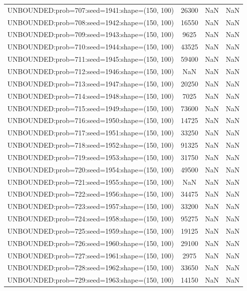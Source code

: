 \begin{longtable}{lccc}
UNBOUNDED:prob=707:seed=1941:shape=(150, 100) & 26300 &   NaN &    NaN \\
UNBOUNDED:prob=708:seed=1942:shape=(150, 100) & 16550 &   NaN &    NaN \\
UNBOUNDED:prob=709:seed=1943:shape=(150, 100) &  9625 &   NaN &    NaN \\
UNBOUNDED:prob=710:seed=1944:shape=(150, 100) & 43525 &   NaN &    NaN \\
UNBOUNDED:prob=711:seed=1945:shape=(150, 100) & 59400 &   NaN &    NaN \\
UNBOUNDED:prob=712:seed=1946:shape=(150, 100) &   NaN &   NaN &    NaN \\
UNBOUNDED:prob=713:seed=1947:shape=(150, 100) & 20250 &   NaN &    NaN \\
UNBOUNDED:prob=714:seed=1948:shape=(150, 100) &  7025 &   NaN &    NaN \\
UNBOUNDED:prob=715:seed=1949:shape=(150, 100) & 73600 &   NaN &    NaN \\
UNBOUNDED:prob=716:seed=1950:shape=(150, 100) & 14725 &   NaN &    NaN \\
UNBOUNDED:prob=717:seed=1951:shape=(150, 100) & 33250 &   NaN &    NaN \\
UNBOUNDED:prob=718:seed=1952:shape=(150, 100) & 91325 &   NaN &    NaN \\
UNBOUNDED:prob=719:seed=1953:shape=(150, 100) & 31750 &   NaN &    NaN \\
UNBOUNDED:prob=720:seed=1954:shape=(150, 100) & 49500 &   NaN &    NaN \\
UNBOUNDED:prob=721:seed=1955:shape=(150, 100) &   NaN &   NaN &    NaN \\
UNBOUNDED:prob=722:seed=1956:shape=(150, 100) & 34475 &   NaN &    NaN \\
UNBOUNDED:prob=723:seed=1957:shape=(150, 100) & 33200 &   NaN &    NaN \\
UNBOUNDED:prob=724:seed=1958:shape=(150, 100) & 95275 &   NaN &    NaN \\
UNBOUNDED:prob=725:seed=1959:shape=(150, 100) & 19125 &   NaN &    NaN \\
UNBOUNDED:prob=726:seed=1960:shape=(150, 100) & 29100 &   NaN &    NaN \\
UNBOUNDED:prob=727:seed=1961:shape=(150, 100) &  2975 &   NaN &    NaN \\
UNBOUNDED:prob=728:seed=1962:shape=(150, 100) & 33650 &   NaN &    NaN \\
UNBOUNDED:prob=729:seed=1963:shape=(150, 100) & 14150 &   NaN &    NaN \\

\end{longtable}
